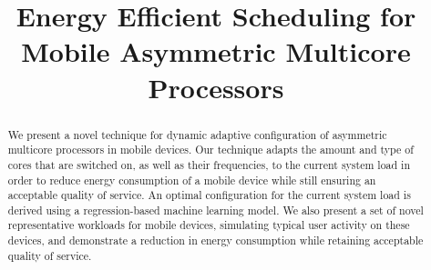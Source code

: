 \documentclass[conference]{IEEEtran}
\begin{document}
\title{Energy Efficient Scheduling for Mobile Asymmetric Multicore Processors}



\maketitle

\begin{abstract}
We present a novel technique for dynamic adaptive configuration of asymmetric multicore processors in mobile devices. Our technique adapts the amount and type of cores that are switched on, as well as their frequencies, to the current system load in order to  reduce energy consumption of a mobile device while still ensuring an acceptable quality of service. An optimal configuration for the current system load is derived using a regression-based machine learning model. We also present a set of novel representative workloads for mobile devices, simulating typical user activity on these devices, and demonstrate a reduction in energy consumption while retaining acceptable quality of service.
\end{abstract}
\end{document}

